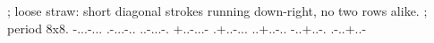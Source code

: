 ; loose straw: short diagonal strokes running down-right, no two rows alike.
; period 8x8.
-...-...
.-...-..
..-...-.
+..-...-
.+..-...
..+..-..
-..+..-.
.-..+..-
